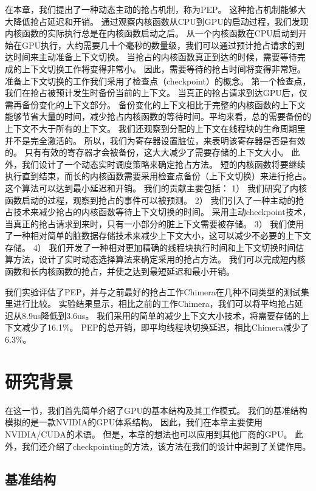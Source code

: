 在本章，我们提出了一种动态主动的抢占机制，称为PEP。
这种抢占机制能够大大降低抢占延迟和开销。
通过观察内核函数从CPU到GPU的启动过程，我们发现内核函数的实际执行总是在内核函数启动之后。
从一个内核函数在CPU启动到开始在GPU执行，大约需要几十个毫秒的数量级，我们可以通过预计抢占请求的到达时间来主动准备上下文切换。
当抢占的内核函数真正到达的时候，需要等待完成的上下文切换工作将变得非常小。
因此，需要等待的抢占时间将变得非常短。准备上下文切换的工作我们采用了检查点（checkpoint）的概念。
第一个检查点，我们在抢占被预计发生时备份当前的上下文。
当真正的抢占请求到达GPU后，仅需再备份变化的上下文部分。
备份变化的上下文相比于完整的内核函数的上下文能够节省大量的时间，减少抢占内核函数的等待时间。平均来看，总的需要备份的上下文不大于所有的上下文。
我们还观察到分配的上下文在线程块的生命周期里并不是完全激活的。
所以，我们为寄存器设置脏位，来表明该寄存器是否是有效的。
只有有效的寄存器才会被备份，这大大减少了需要存储的上下文大小。
此外，我们设计了一个动态实时调度策略来确定抢占方法。
短的内核函数将要继续执行直到结束，而长的内核函数需要采用检查点备份（上下文切换）来进行抢占。
这个算法可以达到最小延迟和开销。
我们的贡献主要包括：
1）	我们研究了内核函数启动的过程，观察到抢占的事件可以被预测。
2）	我们引入了一种主动的抢占技术来减少抢占的内核函数等待上下文切换的时间。
采用主动checkpoint技术，当真正的抢占请求到来时，只有一小部分的脏上下文需要被存储。
3）	我们使用了一种相对简单的脏数据存储技术来减少上下文大小，这可以减少不必要的上下文存储。
4）	我们开发了一种相对更加精确的线程块执行时间和上下文切换时间估算方法，设计了实时动态选择算法来确定采用的抢占方法。
我们可以完成短内核函数和长内核函数的抢占，并使之达到最短延迟和最小开销。

我们实验评估了PEP，并与之前最好的抢占工作Chimera在几种不同类型的测试集里进行比较。
实验结果显示，相比之前的工作Chimera，我们可以将平均抢占延迟从8.9us降低到3.6us。
我们采用的简单的减少上下文大小技术，将需要存储的上下文减少了16.1\%。
PEP的总开销，即平均线程块切换延迟，相比Chimera减少了6.3\%。

\section{研究背景}

在这一节，我们首先简单介绍了GPU的基本结构及其工作模式。
我们的基准结构模拟的是一款NVIDIA的GPU体系结构。
因此，我们在本章主要使用NVIDIA/CUDA的术语。
但是，本章的想法也可以应用到其他厂商的GPU。
此外，我们还介绍了checkpointing的方法，该方法在我们的设计中起到了关键作用。

\subsection{基准结构}

